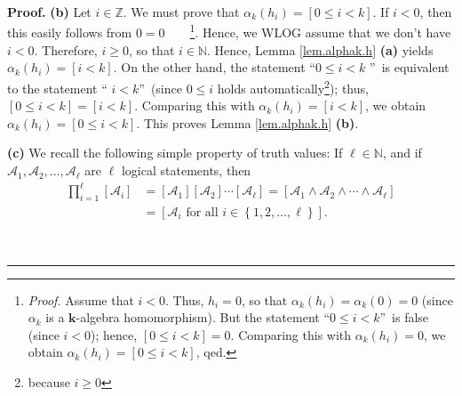 \documentclass[numbers=enddot,12pt,final,onecolumn,notitlepage]{scrartcl}%
\theoremstyle{definition}
\newenvironment{proof}[1][Proof]{\noindent\textbf{#1.} }{\ \rule{0.5em}{0.5em}}
\let\prodnonlimits\prod
\renewcommand{\prod}{\prodnonlimits\limits}
\newenvironment{verlong}{}{}
\begin{document}
\begin{proof}
\begin{verlong}
\textbf{(b)} Let $i\in\mathbb{Z}$. We must prove that $\alpha_{k}\left(
h_{i}\right)  =\left[  0\leq i<k\right]  $. If $i<0$, then this easily follows
from $0=0$\ \ \ \ \footnote{\textit{Proof.} Assume that $i<0$. Thus, $h_{i}%
=0$, so that $\alpha_{k}\left(  h_{i}\right)  =\alpha_{k}\left(  0\right)  =0$
(since $\alpha_{k}$ is a $\mathbf{k}$-algebra homomorphism). But the statement
\textquotedblleft$0\leq i<k$\textquotedblright\ is false (since $i<0$); hence,
$\left[  0\leq i<k\right]  =0$. Comparing this with $\alpha_{k}\left(
h_{i}\right)  =0$, we obtain $\alpha_{k}\left(  h_{i}\right)  =\left[  0\leq
i<k\right]  $, qed.}. Hence, we WLOG assume that we don't have $i<0$.
Therefore, $i\geq0$, so that $i\in\mathbb{N}$. Hence, Lemma \ref{lem.alphak.h}
\textbf{(a)} yields $\alpha_{k}\left(  h_{i}\right)  =\left[  i<k\right]  $.
On the other hand, the statement \textquotedblleft$0\leq i<k$%
\textquotedblright\ is equivalent to the statement \textquotedblleft%
$i<k$\textquotedblright\ (since $0\leq i$ holds automatically\footnote{because
$i\geq0$}); thus, $\left[  0\leq i<k\right]  =\left[  i<k\right]  $. Comparing
this with $\alpha_{k}\left(  h_{i}\right)  =\left[  i<k\right]  $, we obtain
$\alpha_{k}\left(  h_{i}\right)  =\left[  0\leq i<k\right]  $. This proves
Lemma \ref{lem.alphak.h} \textbf{(b)}.
\end{verlong}

\textbf{(c)} We recall the following simple property of truth values: If
$\ell\in\mathbb{N}$, and if $\mathcal{A}_{1},\mathcal{A}_{2},\ldots
,\mathcal{A}_{\ell}$ are $\ell$ logical statements, then
\begin{align}
\prod_{i=1}^{\ell}\left[  \mathcal{A}_{i}\right]   &  =\left[  \mathcal{A}%
_{1}\right]  \left[  \mathcal{A}_{2}\right]  \cdots\left[  \mathcal{A}_{\ell
}\right]  =\left[  \mathcal{A}_{1}\wedge\mathcal{A}_{2}\wedge\cdots
\wedge\mathcal{A}_{\ell}\right] \nonumber\\
&  =\left[  \mathcal{A}_{i}\text{ for all }i\in\left\{  1,2,\ldots
,\ell\right\}  \right]  . \label{pf.lem.alphak.h.c.iversons}%
\end{align}



\end{proof}
\end{document}
